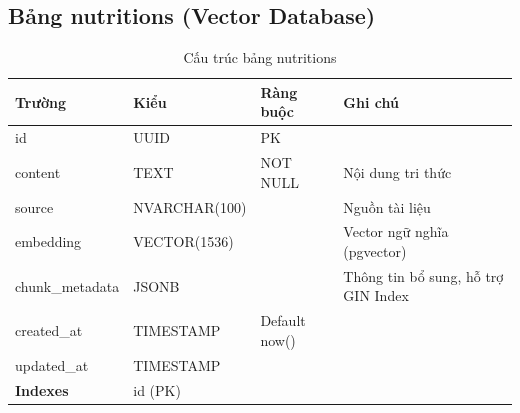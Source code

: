 \documentclass[12pt,a4paper]{article}
\begin{document}
\subsection{Bảng nutritions (Vector Database)}
\begin{longtable}{|l|l|l|p{5.5cm}|}
    \caption{Cấu trúc bảng nutritions}                                                         \\
    \hline
    \rowcolor{headerblue}
    \textbf{Trường} & \textbf{Kiểu} & \textbf{Ràng buộc} & \textbf{Ghi chú}                    \\
    \hline
    id              & UUID          & PK                 &                                     \\
    \hline
    content         & TEXT          & NOT NULL           & Nội dung tri thức                   \\
    \hline
    source          & NVARCHAR(100) &                    & Nguồn tài liệu                      \\
    \hline
    embedding       & VECTOR(1536)  &                    & Vector ngữ nghĩa (pgvector)         \\
    \hline
    chunk\_metadata & JSONB         &                    & Thông tin bổ sung, hỗ trợ GIN Index \\
    \hline
    created\_at     & TIMESTAMP     & Default now()      &                                     \\
    \hline
    updated\_at     & TIMESTAMP     &                    &                                     \\
    \hline
    \rowcolor{headerblue}
    \textbf{Indexes} & \multicolumn{3}{l|}{id (PK)}                                         \\
    \hline
\end{longtable}
\end{document}
